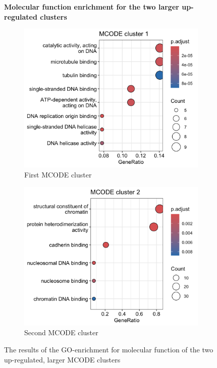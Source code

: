  \begin{figure}[htb]
 	\centering
 	\caption*{\textbf{Molecular function enrichment for the two larger up-regulated clusters}}
		\begin{subfigure}{.49\textwidth}
			\centering
 			\includegraphics[width=\textwidth]{fig/mf-mcode-cluster1}
 			\caption{First MCODE cluster}
 		\end{subfigure}
    	\begin{subfigure}{.49\textwidth}
    		\centering
 			\includegraphics[width=\textwidth]{fig/mf-mcode-cluster2.png}
 			\caption{Second MCODE cluster}
 		\end{subfigure}
 	\caption{The results of the GO-enrichment for molecular function of the two up-regulated, larger MCODE clusters}
 	\label{fig:mcode-cluster-mf}
 \end{figure}

